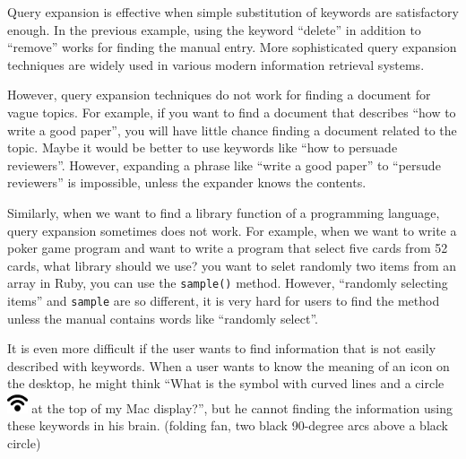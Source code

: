 \documentclass[manuscript,screen,review]{acmart}
\begin{document}
% 

Query expansion is effective when simple substitution of keywords are satisfactory enough.
In the previous example, using the keyword ``delete'' in addition to ``remove'' works
for finding the manual entry.
More sophisticated query expansion techniques are widely used in various modern
information retrieval systems.

However, query expansion techniques do not work for finding a document for vague topics.
For example, if you want to find a document that describes ``how to write a good paper'',
you will have little chance finding a document related to the topic.
Maybe it would be better to use keywords like ``how to persuade reviewers''.
However, expanding a phrase like ``write a good paper'' to ``persude reviewers'' is impossible,
unless the expander knows the contents.


Similarly, 
when we want to find a library function of a programming language,
query expansion sometimes does not work.
For example, when we want to write a poker game program and
want to write a program that select five cards from 52 cards,
what library should we use?
you want to selet randomly two items from an array in Ruby,
you can use the \texttt{sample()} method.
However, ``randomly selecting items'' and \texttt{sample} are so different, it is very hard for users to
find the method unless the manual contains words like ``randomly select''.


It is even more difficult if the user wants to find information that is not easily described with keywords.
When a user wants to know the meaning of an icon on the desktop, he might think
``What is the symbol with curved lines and a circle
\includegraphics[width=6mm,bb=-40 30 225 225]{figures/fb2349ca17df1876178857566e7c68ef.png} %
at the top of my Mac display?'',
but he cannot finding the information using these keywords in his brain.
(folding fan, two black 90-degree arcs above a black circle)
\end{document}
